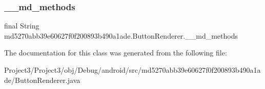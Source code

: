 \subsubsection{\texorpdfstring{\+\_\+\+\_\+md\+\_\+methods}{\_\_md\_methods}}
{\footnotesize\ttfamily final String md5270abb39e60627f0f200893b490a1ade.\+Button\+Renderer.\+\_\+\+\_\+md\+\_\+methods\hspace{0.3cm}{\ttfamily [static]}}



The documentation for this class was generated from the following file\+:\begin{DoxyCompactItemize}
\item 
Project3/\+Project3/obj/\+Debug/android/src/md5270abb39e60627f0f200893b490a1ade/Button\+Renderer.\+java\end{DoxyCompactItemize}
